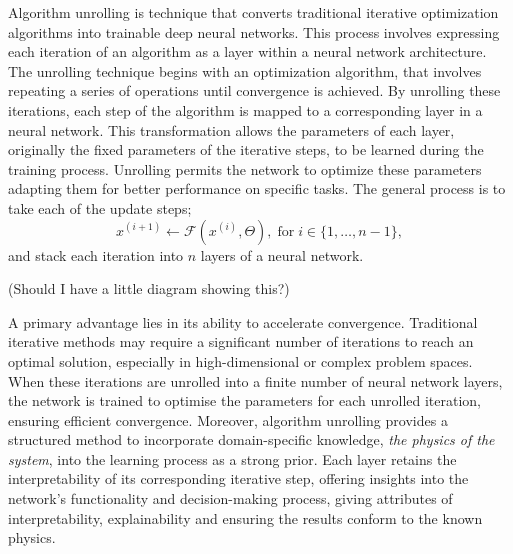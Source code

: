 \IEEEPARstart{}{} Algorithm unrolling is technique that converts traditional iterative optimization algorithms into trainable deep neural networks. This process involves expressing each iteration of an algorithm as a layer within a neural network architecture. The unrolling technique begins with an optimization algorithm, that involves repeating a series of operations until convergence is achieved. By unrolling these iterations, each step of the algorithm is mapped to a corresponding layer in a neural network. This transformation allows the parameters of each layer, originally the fixed parameters of the iterative steps, to be learned during the training process. Unrolling permits the network to optimize these parameters adapting them for better performance on specific tasks. The general process is to take each of the update steps;
\begin{equation*}x^{(i+1)} \leftarrow \mathcal{F}(x^{(i)}, \Theta), \;\mathrm{for}\; i \in \{1, \dots, n - 1\},
\end{equation*}
and stack each iteration into $n$ layers of a neural network. 

\color{red}(Should I have a little diagram showing this?)\color{black}

\IEEEPARstart{}{} A primary advantage lies in its ability to accelerate convergence. Traditional iterative methods may require a significant number of iterations to reach an optimal solution, especially in high-dimensional or complex problem spaces. When these iterations are unrolled into a finite number of neural network layers, the network is trained to optimise the parameters for each unrolled iteration, ensuring efficient convergence. Moreover, algorithm unrolling provides a structured method to incorporate domain-specific knowledge, \textit{the physics of the system}, into the learning process as a strong prior. Each layer retains the interpretability of its corresponding iterative step, offering insights into the network's functionality and decision-making process, giving attributes of interpretability, explainability and ensuring the results conform to the known physics.

